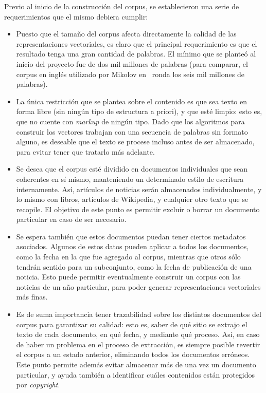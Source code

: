 Previo al inicio de la construcción del corpus, se establecieron una serie de requerimientos que el
mismo debiera cumplir:

\begin{itemize}

\item Puesto que el tamaño del corpus afecta directamente la calidad de las representaciones
vectoriales, es claro que el principal requerimiento es que el resultado tenga una gran cantidad de
palabras. El mínimo que se planteó al inicio del proyecto fue de dos mil millones de palabras (para
comparar, el corpus en inglés utilizado por Mikolov en~\cite{Mikolov2013c} ronda los seis mil
millones de palabras).

\item La única restricción que se plantea sobre el contenido es que sea texto en forma libre (sin
ningún tipo de estructura a priori), y que esté limpio: esto es, que no cuente con \textit{markup}
de ningún tipo. Dado que los algoritmos para construir los vectores trabajan con una secuencia de
palabras sin formato alguno, es deseable que el texto se procese incluso antes de ser almacenado,
para evitar tener que tratarlo más adelante.

\item Se desea que el corpus esté dividido en documentos individuales que sean coherentes en sí
mismo, manteniendo un determinado estilo de escritura internamente. Así, artículos de noticias serán
almacenados individualmente, y lo mismo con libros, artículos de Wikipedia, y cualquier otro texto
que se recopile. El objetivo de este punto es permitir excluir o borrar un documento particular en
caso de ser necesario.

\item Se espera también que estos documentos puedan tener ciertos metadatos asociados. Algunos de
estos datos pueden aplicar a todos los documentos, como la fecha en la que fue agregado al corpus,
mientras que otros sólo tendrán sentido para un subconjunto, como la fecha de publicación de una
noticia. Esto puede permitir eventualmente construir un corpus con las noticias de un año
particular, para poder generar representaciones vectoriales más finas.

\item Es de suma importancia tener trazabilidad sobre los distintos documentos del corpus para
garantizar su calidad: esto es, saber de qué sitio se extrajo el texto de cada documento, en qué
fecha, y mediante qué proceso. Así, en caso de haber un problema en el proceso de extracción, es
siempre posible revertir el corpus a un estado anterior, eliminando todos los documentos
erróneos. Este punto permite además evitar almacenar más de una vez un documento particular, y ayuda
también a identificar cuáles contenidos están protegidos por \textit{copyright}.


\end{itemize}
